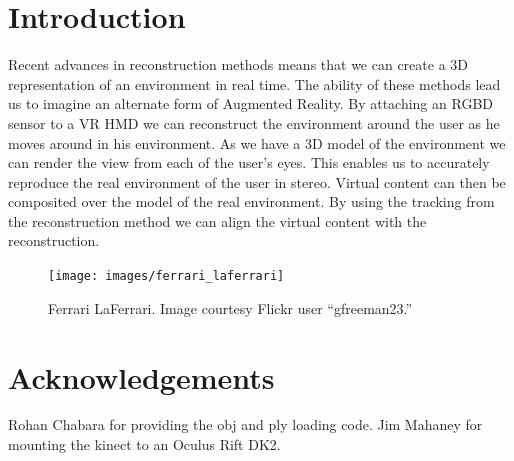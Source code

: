 \documentclass{acmsiggraph}
\begin{document}

%
%


\keywordlist

\conceptlist

\printcopyright

\section{Introduction}


Recent advances in reconstruction methods means that we can create a 3D representation of an environment in real time. The ability of these methods lead us to imagine an alternate form of Augmented Reality. By attaching an RGBD sensor to a VR HMD we can reconstruct the environment around the user as he moves around in his environment. As we have a 3D model of the environment we can render the view from each of the user's eyes. This enables us to accurately reproduce the real environment of the user in stereo. Virtual content can then be composited over the model of the real environment. By using the tracking from the reconstruction method we can align the virtual content with the reconstruction. 

\begin{figure}[ht]
	\centering
	\texttt{[image: images/ferrari\_laferrari]}
	\caption{Ferrari LaFerrari. Image courtesy Flickr user ``gfreeman23.''}
	\label{fig:ferrari}
\end{figure}









\section*{Acknowledgements}

Rohan Chabara for providing the obj and ply loading code. Jim Mahaney for mounting the kinect to an Oculus Rift DK2.


\nocite{*}

\end{document}
